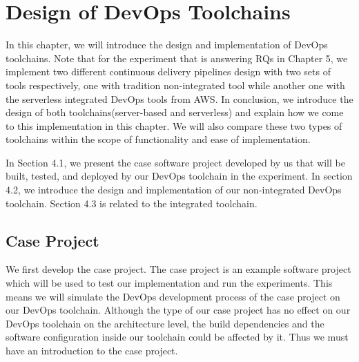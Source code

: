 \chapter{Design of DevOps Toolchains}
In this chapter, we will introduce the design and implementation of DevOps toolchains.
Note that for the experiment that is answering RQs in Chapter 5, we implement two different continuous delivery pipelines design with two sets of tools respectively, one with tradition non-integrated tool while another one with the serverless integrated DevOps tools from AWS. In conclusion, we introduce the design of both toolchains(server-based and serverless) and explain how we come to this implementation in this chapter.
We will also compare these two types of toolchains within the scope of functionality and ease of implementation.
\par
In Section 4.1, we present the case software project developed by us that will be built, tested, and deployed by our DevOps toolchain in the experiment. In section 4.2, we introduce the design and implementation of our non-integrated DevOps toolchain. Section 4.3 is related to the integrated toolchain.
\section{Case Project}
We first develop the case project. The case project is an example software project which will be used to test our implementation and run the experiments. This means we will simulate the DevOps development process of the case project on our DevOps toolchain. Although the type of our case project has no effect on our DevOps toolchain on the architecture level, the build dependencies and the software configuration inside our toolchain could be affected by it. Thus we must have an introduction to the case project.
